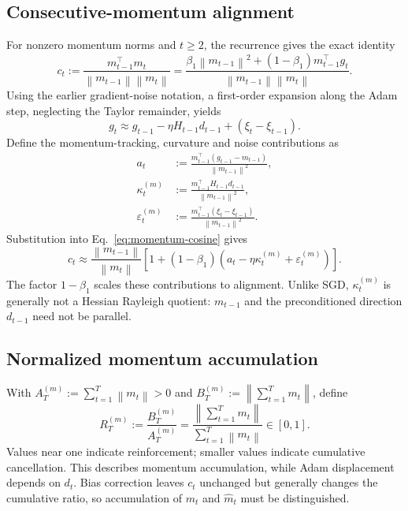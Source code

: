 \documentclass[11pt]{article}
\newcommand{\norm}[1]{\left\lVert#1\right\rVert}
\begin{document}
\subsection{Consecutive-momentum alignment}

For nonzero momentum norms and $t\geq2$, the recurrence gives the exact identity
\begin{equation}
  c_t:=\frac{m_{t-1}^\top m_t}{\norm{m_{t-1}}\norm{m_t}}
  =\frac{\beta_1\norm{m_{t-1}}^2+(1-\beta_1)m_{t-1}^\top g_t}
         {\norm{m_{t-1}}\norm{m_t}}.
  \label{eq:momentum-cosine}
\end{equation}
Using the earlier gradient-noise notation, a first-order expansion along
the Adam step, neglecting the Taylor remainder, yields
\begin{equation}
  g_t\approx g_{t-1}-\eta H_{t-1}d_{t-1}+(\xi_t-\xi_{t-1}).
  \label{eq:adam-gradient-evolution}
\end{equation}
Define the momentum-tracking, curvature and noise contributions as
\begin{equation}
\begin{aligned}
  a_t&:=\frac{m_{t-1}^\top(g_{t-1}-m_{t-1})}{\norm{m_{t-1}}^2},\\
  \kappa_t^{(m)}&:=\frac{m_{t-1}^\top H_{t-1}d_{t-1}}{\norm{m_{t-1}}^2},\\
  \varepsilon_t^{(m)}&:=\frac{m_{t-1}^\top(\xi_t-\xi_{t-1})}{\norm{m_{t-1}}^2}.
\end{aligned}
\label{eq:momentum-contributions}
\end{equation}
Substitution into Eq.~\eqref{eq:momentum-cosine} gives
\begin{equation}
  \boxed{c_t\approx\frac{\norm{m_{t-1}}}{\norm{m_t}}
  \left[1+(1-\beta_1)
  \left(a_t-\eta\kappa_t^{(m)}+\varepsilon_t^{(m)}\right)\right].}
  \label{eq:momentum-alignment-model}
\end{equation}
The factor $1-\beta_1$ scales these contributions to alignment.
Unlike SGD, $\kappa_t^{(m)}$ is generally not a Hessian Rayleigh quotient:
$m_{t-1}$ and the preconditioned direction $d_{t-1}$ need not be parallel.

\subsection{Normalized momentum accumulation}

With $A_T^{(m)}:=\sum_{t=1}^T\norm{m_t}>0$ and
$B_T^{(m)}:=\norm{\sum_{t=1}^T m_t}$, define
\begin{equation}
  \boxed{R_T^{(m)}:=\frac{B_T^{(m)}}{A_T^{(m)}}
  =\frac{\norm{\sum_{t=1}^T m_t}}{\sum_{t=1}^T\norm{m_t}}\in[0,1].}
  \label{eq:momentum-accumulation}
\end{equation}
Values near one indicate reinforcement; smaller values indicate cumulative
cancellation. This describes momentum accumulation, while Adam displacement
depends on $d_t$. Bias correction leaves $c_t$ unchanged but generally changes
the cumulative ratio, so accumulation of $m_t$ and $\widehat m_t$ must be
distinguished.
\end{document}
